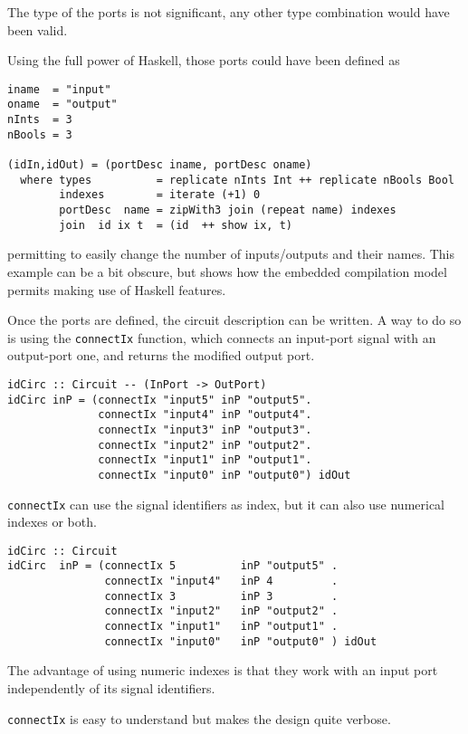The type of the ports is not significant, any other type combination would
have been valid.


Using the full power of Haskell, those ports could have been defined as

\begin{lstlisting}
iname  = "input"
oname  = "output"
nInts  = 3
nBools = 3

(idIn,idOut) = (portDesc iname, portDesc oname)
  where types          = replicate nInts Int ++ replicate nBools Bool
        indexes        = iterate (+1) 0
        portDesc  name = zipWith3 join (repeat name) indexes
        join  id ix t  = (id  ++ show ix, t)
\end{lstlisting}
permitting to easily change the number of inputs/outputs and their
names. This example can be a bit obscure, but shows how the embedded
compilation model permits making use of Haskell features.


Once the ports are defined, the circuit description can be written. A
way to do so is using the \texttt{connectIx} function, which connects
an input-port signal with an output-port one, and returns the modified
output port.

\begin{lstlisting}
idCirc :: Circuit -- (InPort -> OutPort)                 
idCirc inP = (connectIx "input5" inP "output5".
              connectIx "input4" inP "output4".
              connectIx "input3" inP "output3".
              connectIx "input2" inP "output2".
              connectIx "input1" inP "output1".
              connectIx "input0" inP "output0") idOut
\end{lstlisting}

\texttt{connectIx} can use the signal identifiers as index, but it can
also use numerical indexes or both.

\begin{lstlisting}
idCirc :: Circuit
idCirc  inP = (connectIx 5          inP "output5" .
               connectIx "input4"   inP 4         .
               connectIx 3          inP 3         .
               connectIx "input2"   inP "output2" .
               connectIx "input1"   inP "output1" .
               connectIx "input0"   inP "output0" ) idOut
\end{lstlisting}

The advantage of using numeric indexes is that they work with an
input port independently of its signal identifiers.

\texttt{connectIx} is easy to understand but makes the design
quite verbose.

